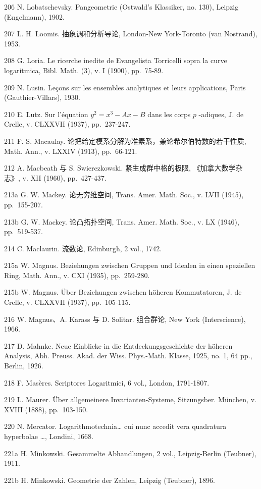 206 N. Lobatschevsky. Pangeometrie (Ostwald's Klassiker, no. 130), Leipzig (Engelmann), 1902.

207 L. H. Loomis. 抽象调和分析导论, London-New York-Toronto (van Nostrand), 1953.

208 G. Loria. Le ricerche inedite de Evangelista Torricelli sopra la curve logaritmica, Bibl. Math. (3), v. I (1900), pp.~75-89.

209 N. Lusin. Leçons sur les ensembles analytiques et leurs applications, Paris (Gauthier-Villars), 1930.

210 E. Lutz. Sur l'équation \(y^{2} = x^{3} - Ax - B\) dans les corps \(p\) -adiques, J. de Crelle, v. CLXXVII (1937), pp.~237-247.

211 F. S. Macaulay. 论把给定模系分解为准素系，兼论希尔伯特数的若干性质, Math. Ann., v. LXXIV (1913), pp.~66-121.

212 A. Macbeath 与 S. Swierczkowski. 紧生成群中格的极限, 《加拿大数学杂志》, v. XII (1960), pp.~427-437.

213a G. W. Mackey. 论无穷维空间, Trans. Amer. Math. Soc., v. LVII (1945), pp.~155-207.

213b G. W. Mackey. 论凸拓扑空间, Trans. Amer. Math. Soc., v. LX (1946), pp.~519-537.

214 C. Maclaurin. 流数论, Edinburgh, 2 vol., 1742.

215a W. Magnus. Beziehungen zwischen Gruppen und Idealen in einen speziellen Ring, Math. Ann., v. CXI (1935), pp.~259-280.

215b W. Magnus. Über Beziehungen zwischen höheren Kommutatoren, J. de Crelle, v. CLXXVII (1937), pp.~105-115.

216 W. Magnus、A. Karass 与 D. Solitar. 组合群论, New York (Interscience), 1966.

217 D. Mahnke. Neue Einblicke in die Entdeckungsgeschichte der höheren Analysis, Abh. Preuss. Akad. der Wiss. Phys.-Math. Klasse, 1925, no. 1, 64 pp., Berlin, 1926.

218 F. Masères. Scriptores Logaritmici, 6 vol., London, 1791-1807.

219 L. Maurer. Über allgemeinere Invarianten-Systeme, Sitzungsber. München, v. XVIII (1888), pp.~103-150.

220 N. Mercator. Logarithmotechnia\ldots{} cui nunc accedit vera quadratura hyperbolae \ldots, Londini, 1668.

221a H. Minkowski. Gesammelte Abhandlungen, 2 vol., Leipzig-Berlin (Teubner), 1911.

221b H. Minkowski. Geometrie der Zahlen, Leipzig (Teubner), 1896.

